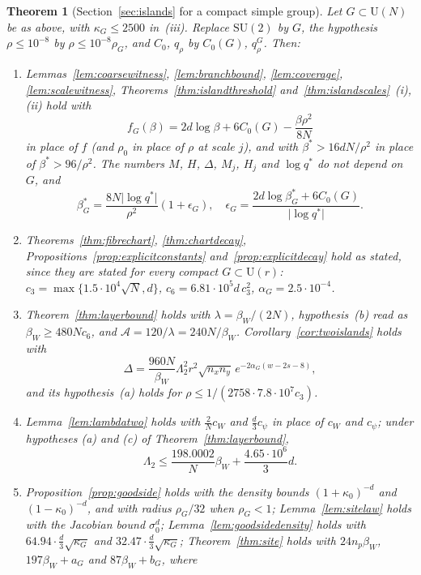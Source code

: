 \documentclass[11pt]{amsart}
\newtheorem{theorem}{Theorem}[section]
\theoremstyle{definition}
\theoremstyle{remark}
\numberwithin{equation}{section}
\newcommand{\SU}{\mathrm{SU}}
\newcommand{\U}{\mathrm{U}}
\begin{document}
\begin{theorem}[Section~\ref{sec:islands} for a compact simple group]
\label{thm:groups13}
Let $G\subset\U(N)$ be as above, with $\kappa_G\le2500$ in~(iii).
Replace $\SU(2)$ by $G$, the hypothesis $\rho\le10^{-8}$ by $\rho\le
10^{-8}\rho_G$, and $C_0$, $q_\rho$ by $C_0(G)$, $q^G_\rho$. Then:
\begin{enumerate}[label=\textup{(\roman*)},leftmargin=*]
\item Lemmas~\ref{lem:coarsewitness}, \ref{lem:branchbound},
\ref{lem:coverage}, \ref{lem:scalewitness}, Theorems~\ref{thm:islandthreshold}
and~\ref{thm:islandscales}~\textup{(i)}, \textup{(ii)} hold with
\[
f_G(\beta)=2d\log\beta+6C_0(G)-\frac{\beta\rho^2}{8N}
\]
in place of $f$ (and $\rho_0$ in place of $\rho$ at scale $j$), and with
$\beta^*>16dN/\rho^2$ in place of $\beta^*>96/\rho^2$. The numbers $M$,
$H$, $\varDelta$, $M_j$, $H_j$ and $\log q^*$ do not depend on $G$, and
\[
\beta^*_G=\frac{8N\lvert\log q^*\rvert}{\rho^2}(1+\epsilon_G),\quad
\epsilon_G=\frac{2d\log\beta^*_G+6C_0(G)}{\lvert\log q^*\rvert}.
\]
\item Theorems~\ref{thm:fibrechart}, \ref{thm:chartdecay},
Propositions~\ref{prop:explicitconstants} and~\ref{prop:explicitdecay}
hold as stated, since they are stated for every compact $G\subset\U(r)$:
$c_3=\max\{1.5\cdot10^4\sqrt N,d\}$, $c_6=6.81\cdot10^5d\,c_3^2$,
$\alpha_G=2.5\cdot10^{-4}$.
\item Theorem~\ref{thm:layerbound} holds with $\lambda=\beta_W/(2N)$,
hypothesis~(b) read as $\beta_W\ge480Nc_6$, and $\mathcal A=120/\lambda=
240N/\beta_W$. Corollary~\ref{cor:twoislands} holds with
\[
\varDelta=\frac{960N}{\beta_W}\Lambda_2^2r^2\sqrt{n_xn_y}\,e^{-2\alpha_G
(w-2s-8)},
\]
and its hypothesis~(a) holds for $\rho\le1/(2758\cdot7.8\cdot10^7c_3)$.
\item Lemma~\ref{lem:lambdatwo} holds with $\frac2Nc_W$ and $\frac d3
c_\psi$ in place of $c_W$ and $c_\psi$; under hypotheses (a) and (c) of
Theorem~\ref{thm:layerbound},
\[
\Lambda_2\le\frac{198.0002}N\beta_W+\frac{4.65\cdot10^6}3d .
\]
\item Proposition~\ref{prop:goodside} holds with the density bounds
$(1+\kappa_0)^{-d}$ and $(1-\kappa_0)^{-d}$, and with radius
$\rho_G/32$ when $\rho_G<1$; Lemma~\ref{lem:sitelaw} holds with the
Jacobian bound $\sigma_0^d$; Lemma~\ref{lem:goodsidedensity} holds with
$64.94\cdot\frac d3\sqrt{\kappa_G}$ and $32.47\cdot\frac d3\sqrt
{\kappa_G}$; Theorem~\ref{thm:site} holds with $24n_p\beta_W$,
$197\beta_W+a_G$ and $87\beta_W+b_G$, where
\begin{gather*}

\end{gather*}
\end{enumerate}
\end{theorem}
\end{document}
